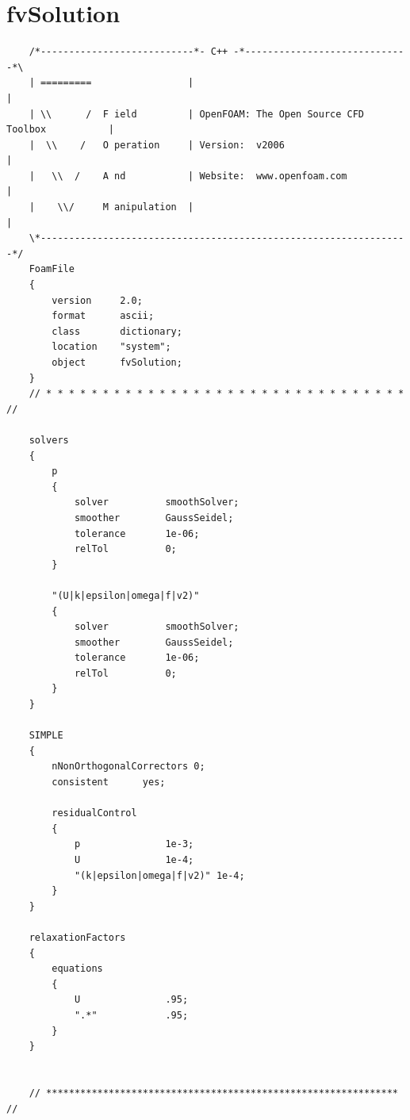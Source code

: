\documentclass[a4paper,12pt]{report}
\theoremstyle{remark}
\begin{document}
{\let\clearpage\relax \chapter{fvSolution}\label{app:fvsol}}
\begin{verbatim}
	/*---------------------------*- C++ -*-----------------------------*\
	| =========                 |                                                 |
	| \\      /  F ield         | OpenFOAM: The Open Source CFD Toolbox           |
	|  \\    /   O peration     | Version:  v2006                                 |
	|   \\  /    A nd           | Website:  www.openfoam.com                      |
	|    \\/     M anipulation  |                                                 |
	\*-----------------------------------------------------------------*/
	FoamFile
	{
		version     2.0;
		format      ascii;
		class       dictionary;
		location    "system";
		object      fvSolution;
	}
	// * * * * * * * * * * * * * * * * * * * * * * * * * * * * * * * * //
	
	solvers
	{
		p
		{
			solver          smoothSolver;
			smoother        GaussSeidel;
			tolerance       1e-06;
			relTol          0; 
		}
		
		"(U|k|epsilon|omega|f|v2)"
		{
			solver          smoothSolver;
			smoother        GaussSeidel;
			tolerance       1e-06;
			relTol          0; 
		}
	}
	
	SIMPLE
	{
		nNonOrthogonalCorrectors 0;
		consistent      yes;
		
		residualControl
		{
			p               1e-3;
			U               1e-4;
			"(k|epsilon|omega|f|v2)" 1e-4;
		}
	}
	
	relaxationFactors
	{
		equations
		{
			U               .95; 
			".*"            .95;
		}
	}
	
	
	// ************************************************************** //
\end{verbatim}
	
\end{document}
